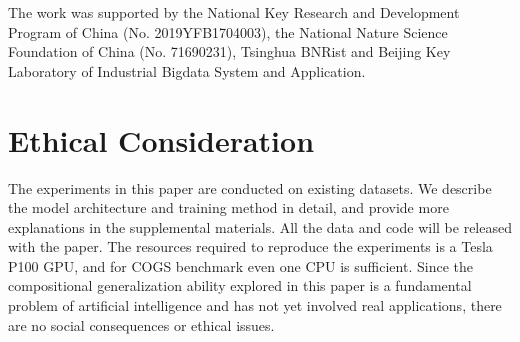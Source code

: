 \documentclass[11pt,a4paper]{article}
\begin{document}
The work was supported by the National Key Research and Development Program of China (No. 2019YFB1704003), the National Nature Science Foundation of China (No. 71690231), Tsinghua BNRist and Beijing Key Laboratory of Industrial Bigdata System and Application.

\section*{Ethical Consideration}

The experiments in this paper are conducted on existing datasets. We describe the model architecture and training method in detail, and provide more explanations in the supplemental materials. All the data and code will be released with the paper. The resources required to reproduce the experiments is a Tesla P100 GPU, and for COGS benchmark even one CPU is sufficient. Since the compositional generalization ability explored in this paper is a fundamental problem of artificial intelligence and has not yet involved real applications, there are no social consequences or ethical issues.
\end{document}
